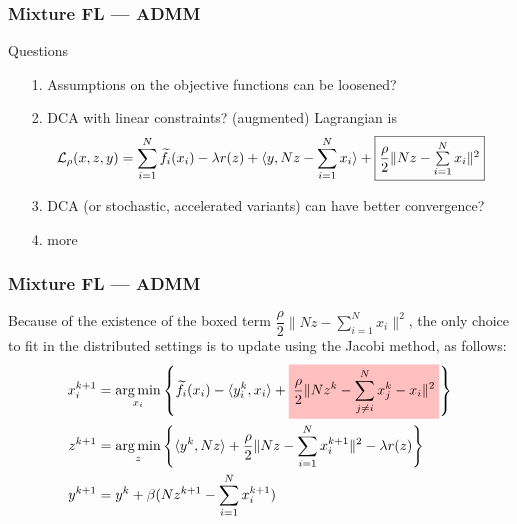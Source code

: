 \begin{frame}
\frametitle{Mixture FL --- ADMM}

\begin{block}{Questions}
\begin{itemize}
    \item[1.] Assumptions on the objective functions can be loosened?
    \item[2.] DCA with linear constraints? (augmented) Lagrangian is
    {\scriptsize
    $$\mathcal{L}_{\rho}(x,z,y) = \sum\limits_{i=1}^N \widetilde{f}_i(x_i) - \lambda r(z) + \langle y, Nz - \sum\limits_{i=1}^N x_i \rangle + \framebox{$\dfrac{\rho}{2} \lVert Nz - \sum\limits_{i=1}^N x_i \rVert^2$} $$
    }
    \item[3.] DCA (or stochastic, accelerated variants) can have better convergence?
    \item[4.] more
\end{itemize}
\end{block}

\end{frame}


\begin{frame}
\frametitle{Mixture FL --- ADMM}

Because of the existence of the boxed term $\dfrac{\rho}{2} \lVert Nz - \sum\limits_{i=1}^N x_i \rVert^2$, the only choice to fit in the distributed settings is to update using the Jacobi method, as follows:
{\footnotesize
\begin{align*}
    x_i^{k+1} & = \argmin_{x_i} \left\{ \widetilde{f}_i(x_i) - \langle y_i^k, x_i \rangle + \colorbox{pink}{$\displaystyle \frac{\rho}{2} \lVert Nz^k - \sum\limits_{j\neq i}^N x_j^k - x_i \rVert^2$} \right\} \\
    z^{k+1} & = \argmin_{z} \left\{ \langle y^k, Nz \rangle + \frac{\rho}{2} \lVert Nz - \sum\limits_{i=1}^N x_i^{k+1} \rVert^2 - \lambda r(z) \right\} \\
    y^{k+1} & = y^k + \beta (Nz^{k+1} - \sum\limits_{i=1}^N x_i^{k+1})
\end{align*}
}

\end{frame}


